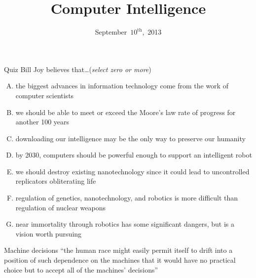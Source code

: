 \documentclass{beamer}
\title{Computer Intelligence}
\date{September~$10^{\text{th}}$,~2013}
\begin{document}
\begin{frame}
\titlepage
\end{frame}

\begin{frame}{Quiz}
Bill Joy believes that\ldots \hfill (\emph{select zero or more})
\begin{enumerate}[(A)]
\item<1> the biggest advances in information technology come from the work of computer scientists %
\item<1> we should be able to meet or exceed the Moore's law rate of progress for another 100 years %
\item<1> downloading our intelligence may be the only way to preserve our humanity %
\item<1-2> by 2030, computers should be powerful enough to support an intelligent robot
\item<1> we should destroy existing nanotechnology since it could lead to uncontrolled replicators obliterating life %
\item<1-2> regulation of genetics, nanotechnology, and robotics is more difficult than regulation of nuclear weapons %
\item<1> near immortality through robotics has some significant dangers, but is a vision worth pursuing
\end{enumerate}
\end{frame}

\begin{frame}{Machine decisions}
``the human race might easily permit itself to drift into a position of such dependence on the machines that it would have no practical choice but to accept all of the machines' decisions'' \\
\bigskip
\href{https://www.youtube.com/watch?v=ogBX18maUiM}{}
\end{frame}
\end{document}
